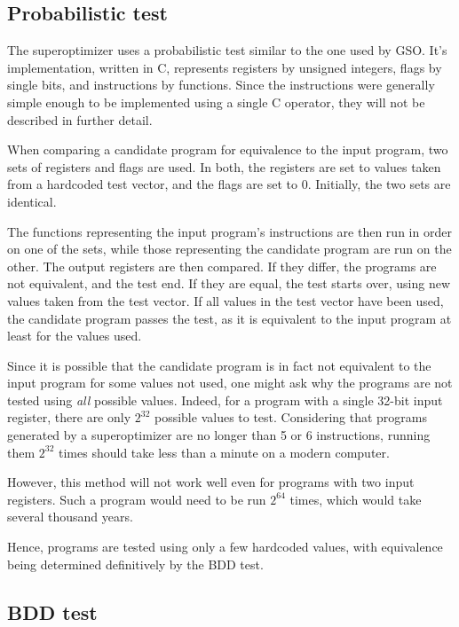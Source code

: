 \documentclass[a4paper,11pt]{kth-mag}
\begin{document}
\subsection{Probabilistic test}
\label{ss:probabilistic_test}

The superoptimizer uses a probabilistic test similar to the one used by GSO.
It's implementation, written in C, represents registers by unsigned integers, flags by single bits, and instructions by functions.
Since the instructions were generally simple enough to be implemented using a single C operator, they will not be described in further detail.

When comparing a candidate program for equivalence to the input program, two sets of registers and flags are used.
In both, the registers are set to values taken from a hardcoded test vector, and the flags are set to 0.
Initially, the two sets are identical.

The functions representing the input program's instructions are then run in order on one of the sets, while those representing the candidate program are run on the other.
The output registers are then compared.
If they differ, the programs are not equivalent, and the test end.
If they are equal, the test starts over, using new values taken from the test vector.
If all values in the test vector have been used, the candidate program passes the test, as it is equivalent to the input program at least for the values used.

Since it is possible that the candidate program is in fact not equivalent to the input program for some values not used, one might ask why the programs are not tested using \emph{all} possible values.
Indeed, for a program with a single 32-bit input register, there are only $2^{32}$ possible values to test.
Considering that programs generated by a superoptimizer are no longer than 5 or 6 instructions, running them $2^{32}$ times should take less than a minute on a modern computer.

However, this method will not work well even for programs with two input registers.
Such a program would need to be run $2^{64}$ times, which would take several thousand years.


Hence, programs are tested using only a few hardcoded values, with equivalence being determined definitively by the BDD test.

\subsection{BDD test}
\label{ss:bdd_test}
\end{document}
